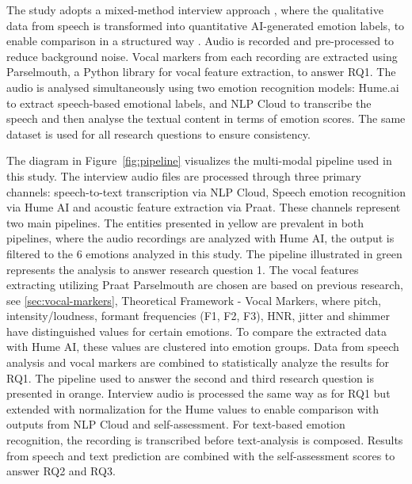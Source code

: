 The study adopts a mixed-method interview approach \autocite{Bryman2022}, where the qualitative data from speech is transformed into quantitative AI-generated emotion labels, to enable comparison in a structured way \autocite{Creswell2023}.
Audio is recorded and pre-processed to reduce background noise. Vocal markers from each recording are extracted using Parselmouth, a Python library for vocal feature extraction, to answer RQ1. The audio is analysed simultaneously using two emotion recognition models: Hume.ai to extract speech-based emotional labels, and NLP Cloud to transcribe the speech and then analyse the textual content in terms of emotion scores. The same dataset is used for all research questions to ensure consistency. 

The diagram in Figure~\ref{fig:pipeline} visualizes the multi-modal pipeline used in this study.  
The interview audio files are processed through three primary channels: speech-to-text transcription via NLP Cloud,  
Speech emotion recognition via Hume AI and acoustic feature extraction via Praat.  
These channels represent two main pipelines.  
The entities presented in yellow are prevalent in both pipelines, where the audio recordings are analyzed with Hume AI, the output is filtered to the 6 emotions analyzed in this study.  
The pipeline illustrated in green represents the analysis to answer research question 1.  
The vocal features extracting utilizing Praat Parselmouth are chosen are based on previous research, see \ref{sec:vocal-markers}, Theoretical Framework - Vocal Markers, where pitch, intensity/loudness, formant frequencies (F1, F2, F3), HNR,  
jitter and shimmer have distinguished values for certain emotions.  
To compare the extracted data with Hume AI, these values are clustered into emotion groups.  
Data from speech analysis and vocal markers are combined to statistically analyze the results for RQ1.  
The pipeline used to answer the second and third research question is presented in orange. 
Interview audio is processed the same way as for RQ1 but extended with normalization for the Hume values to enable comparison with outputs from NLP Cloud and self-assessment.  
For text-based emotion recognition, the recording is transcribed before text-analysis is composed. 
Results from speech and text prediction are combined with the self-assessment scores to answer RQ2 and RQ3. 

